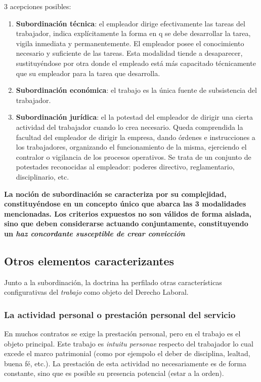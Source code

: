 \documentclass[spanish,12pt,a4paper,titlepage]{report}
\begin{document}
3 acepciones posibles:
\begin{enumerate}
	\item \textbf{Subordinación técnica}: el empleador dirige efectivamente las tareas del trabajador, indica explícitamente la forma en q se debe desarrollar la tarea, vigila inmediata y permanentemente. El empleador posee el conocimiento necesario y suficiente de las tareas. Esta modalidad tiende a desaparecer, sustituyéndose por otra donde el empleado está más capacitado técnicamente que su empleador para la tarea que desarrolla.
	\item \textbf{Subordinación económica}: el trabajo es la única fuente de subsistencia del trabajador.
	\item \textbf{Subordinación jurídica}: el la potestad del empleador de dirigir una cierta actividad del trabajador cuando lo crea necesario. Queda comprendida la facultad del empleador de dirigir la empresa, dando órdenes e instrucciones a los trabajadores, organizando el funcionamiento de la misma, ejerciendo el contralor o vigilancia de los procesos operativos. Se trata de un conjunto de potestades reconocidas al empleador: poderes directivo, reglamentario, disciplinario, etc.
\end{enumerate}

\textbf{La noción de subordinación se caracteriza por su complejidad, constituyéndose en un concepto único que abarca las 3 modalidades mencionadas. Los criterios expuestos no son válidos de forma aislada, sino que deben considerarse actuando conjuntamente, constituyendo un \textit{haz concordante susceptible de crear convicción}}

\subsection{Otros elementos caracterizantes}
Junto a la subordinación, la doctrina ha perfilado otras características configurativas del \textit{trabajo} como objeto del Derecho Laboral.

\subsubsection{La actividad personal o prestación personal del servicio}
En muchos contratos se exige la prestación personal, pero en el trabajo es el objeto principal. Este trabajo es \textit{intuitu personae} respecto del trabajador lo cual excede el marco patrimonial (como por ejempolo el deber de disciplina, lealtad, buena fé, etc.).
La prestación de esta actividad no necesariamente es de forma constante, sino que es posible su presencia potencial (estar a la orden).
\end{document}
